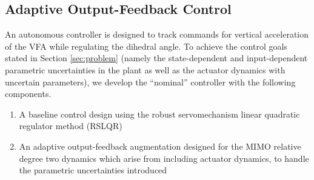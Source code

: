 \documentclass[english]{ifacconf}
\begin{document}
\subsection{Adaptive Output-Feedback Control}\label{subsec:sc_adaptive}
%
An autonomous controller is designed  to track commands for vertical acceleration of the VFA while regulating the dihedral angle. To achieve the control goals stated in Section \ref{sec:problem} (namely the state-dependent and input-dependent parametric uncertainties in the plant as well as the actuator dynamics with uncertain parameters), we develop the ``nominal'' controller with the following components.
\begin{enumerate}
	\item A baseline control design using the robust servomechanism linear quadratic regulator method (RSLQR)
	\item An adaptive output-feedback augmentation designed for the MIMO relative degree two dynamics which arise from including actuator dynamics, to handle the parametric uncertainties introduced
\end{enumerate}
\end{document}
